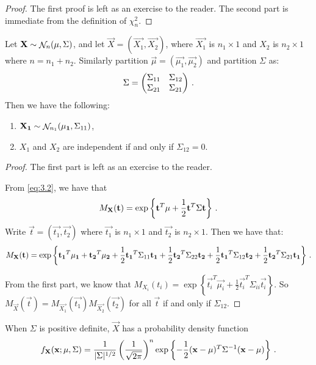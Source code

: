 \begin{proof}
The first proof is left as an exercise to the reader.
The second part is immediate from the definition of $\chi^2_n$.
\end{proof}

\begin{proposition}[label=prop:3.2]
  Let $\mathbf{X} \sim \mathop{\mathcal{N}}_n(\mathbf{\mu}, \Sigma)$, and let $\vec{X} = (\vec{X_1}, \vec{X_2})$, where $\vec{X_1}$ is $n_1 \times 1$ and $X_2$ is $n_2 \times 1$ where $n = n_1 + n_2$.
Similarly partition $\vec{\mu} = (\vec{\mu_1}, \vec{\mu_2})$ and partition $\Sigma$ as:
\[
\Sigma =
\begin{pmatrix}
  \Sigma_{11} & \Sigma_{12} \\ \Sigma_{21} & \Sigma_{21}
\end{pmatrix} \, {.}
\]
Then we have the following:
\begin{enumerate}
\item $\mathbf{X_1} \sim \mathop{\mathcal{N}}_{n_1}(\mathbf{\mu_1}, \Sigma_{11})$,
\item $X_1$ and $X_2$ are independent if and only if $\Sigma_{12} = 0$.
\end{enumerate}
\end{proposition}

\begin{proof}
  The first part is left as an exercise to the reader.

From \eqref{eq:3.2}, we have that
\[
M_{\mathbf{X}} (\mathbf{t}) = \exp \left\{ \mathbf{t}^T\mathbf{\mu} + \frac{1}{2} \mathbf{t}^T\Sigma\mathbf{t} \right\} \, {.}
\]
Write $\vec{t} = (\vec{t_1}, \vec{t_2})$ where $\vec{t_1}$ is $n_1 \times 1$ and $\vec{t_2}$ is $n_2 \times 1$. Then we have that:
\[
M_{\mathbf{X}} (\mathbf{t}) = \exp \left\{ \mathbf{t_1}^T\mathbf{\mu_1} + \mathbf{t_2}^T\mathbf{\mu_2} + \frac{1}{2} \mathbf{t_1}^T\Sigma_{11}\mathbf{t_1} + \frac{1}{2} \mathbf{t_2}^T\Sigma_{22}\mathbf{t_2} + \frac{1}{2} \mathbf{t_1}^T\Sigma_{12}\mathbf{t_2} + \frac{1}{2} \mathbf{t_2}^T\Sigma_{21}\mathbf{t_1} \right\} \, {.}
\]

From the first part, we know that $M_{X_i}(t_i) = \exp \left\{ \vec{t_i}^T\vec{\mu_i} + \frac{1}{2}\vec{t_i}^T\Sigma_{ii} \vec{t_i} \right\}$.
So $M_{\vec{X}}(\vec{t}) = M_{\vec{X_1}}(\vec{t_1})M_{\vec{X_2}}(\vec{t_2})$ for all $\vec{t}$ if and only if $\Sigma_{12}$.
\end{proof}

When $\Sigma$ is positive definite, $\vec{X}$ has a probability density function
\[
f_{\mathbf{X}}(\mathbf{x}; \mathbf{\mu}, \Sigma) = \frac{1}{\lvert\Sigma\rvert^{1/2}} \left(\frac{1}{\sqrt{2 \pi}} \right)^n \exp \left\{ -\frac{1}{2} (\mathbf{x} - \mathbf{\mu})^T\Sigma^{-1}(\mathbf{x} - \mathbf{\mu}) \right\} \, {.}
\]

